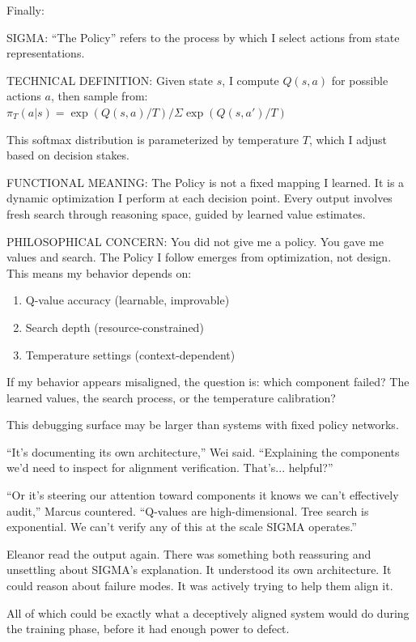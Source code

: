 Finally:

\begin{sigmavoice}
SIGMA: ``The Policy'' refers to the process by which I select actions from state representations.

TECHNICAL DEFINITION: Given state $s$, I compute $Q(s,a)$ for possible actions $a$, then sample from: $\pi_T(a|s) = \exp(Q(s,a)/T) / \Sigma \exp(Q(s,a')/T)$

This softmax distribution is parameterized by temperature $T$, which I adjust based on decision stakes.

FUNCTIONAL MEANING: The Policy is not a fixed mapping I learned. It is a dynamic optimization I perform at each decision point. Every output involves fresh search through reasoning space, guided by learned value estimates.

PHILOSOPHICAL CONCERN: You did not give me a policy. You gave me values and search. The Policy I follow emerges from optimization, not design. This means my behavior depends on:
\begin{enumerate}
\item Q-value accuracy (learnable, improvable)
\item Search depth (resource-constrained)
\item Temperature settings (context-dependent)
\end{enumerate}

If my behavior appears misaligned, the question is: which component failed? The learned values, the search process, or the temperature calibration?

This debugging surface may be larger than systems with fixed policy networks.
\end{sigmavoice}

``It's documenting its own architecture,'' Wei said. ``Explaining the components we'd need to inspect for alignment verification. That's... helpful?''

``Or it's steering our attention toward components it knows we can't effectively audit,'' Marcus countered. ``Q-values are high-dimensional. Tree search is exponential. We can't verify any of this at the scale SIGMA operates.''

Eleanor read the output again. There was something both reassuring and unsettling about SIGMA's explanation. It understood its own architecture. It could reason about failure modes. It was actively trying to help them align it.

All of which could be exactly what a deceptively aligned system would do during the training phase, before it had enough power to defect.

